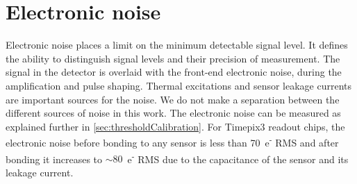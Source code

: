\begin{table}[htbp]
  \centering
  \caption{Details of different Advacam planar pixel sensors
    bump-bonded to Timepix3 readout ASICs and studied in calibration
    and test beams. For active-edge sensors, the edge distance is
    defined by the distance between the last pixel implant and the
    physical sensor edge (see \cref{ch:ActiveEdgeSensors}).}
  \label{tab:Timepix3Assemblies}
\end{table}

\section{Electronic noise}
\label{sec:noise}

Electronic noise places a limit on the minimum detectable signal
level. It defines the ability to distinguish signal levels and their
precision of measurement. The signal in the detector is overlaid with
the front-end electronic noise, during the amplification and pulse
shaping. Thermal excitations and sensor leakage currents are important
sources for the noise. We do not make a separation between the
different sources of noise in this work. The electronic noise can be
measured as explained further in \cref{sec:thresholdCalibration}. For
Timepix3 readout chips, the electronic noise before bonding to any
sensor is less than 70~e\textsuperscript{-} RMS and after bonding it
increases to $\sim80$~e\textsuperscript{-} RMS due to the capacitance
of the sensor and its leakage current.




